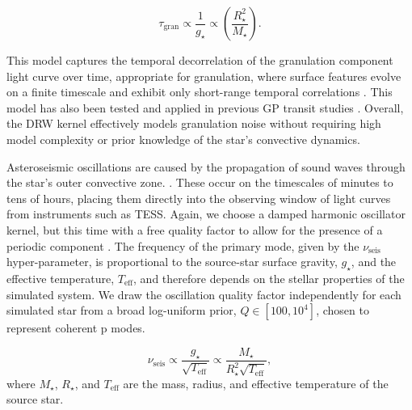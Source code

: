 \documentclass[fleqn,usenatbib]{mnras}
\begin{document}
\begin{equation}
    \tau_\mathrm{gran} \propto \frac{1}{g_\star}
    \propto \left(\frac{R_\star^2}{M_\star}\right).
\end{equation}

This model captures the temporal decorrelation of the granulation component light curve over time, appropriate for granulation, where surface features evolve on a finite timescale and exhibit only short-range temporal correlations \citep{aigrain_gaussian_2023}. This model has also been tested and applied in previous GP transit studies \citep{brewer_gaussian_2009,nicholson_quasi-periodic_2022}. Overall, the DRW kernel effectively models granulation noise without requiring high model complexity or prior knowledge of the star’s convective dynamics.

Asteroseismic oscillations are caused by the propagation of sound waves through the star's outer convective zone. \citep{kjeldsen_amplitudes_1995,chaplin_asteroseismology_2013}. These occur on the timescales of minutes to tens of hours, placing them directly into the observing window of light curves from instruments such as TESS. Again, we choose a damped harmonic oscillator kernel, but this time with a free quality factor to allow for the presence of a periodic component \citep{brewer_gaussian_2009,foreman-mackey_exoplanet_2021}. The frequency of the primary mode, given by the $\nu_\mathrm{seis}$ hyper-parameter, is proportional to the source-star surface gravity, $g_\star$, and the effective temperature, $T_\mathrm{eff}$, and therefore depends
on the stellar properties of the simulated system. We draw the oscillation quality factor independently for each simulated star from a broad log-uniform prior, $Q\in[100,10^4]$, chosen to represent coherent p modes.

\begin{equation}
    \nu_\mathrm{seis} \propto \frac{g_\star}{\sqrt{T_\mathrm{eff}}}
    \propto \frac{M_\star}{R_\star^2 \sqrt{T_\mathrm{eff}}},
\end{equation}
where $M_\star$, $R_\star$, and $T_\mathrm{eff}$ are the mass, radius, and effective
temperature of the source star.
\end{document}
